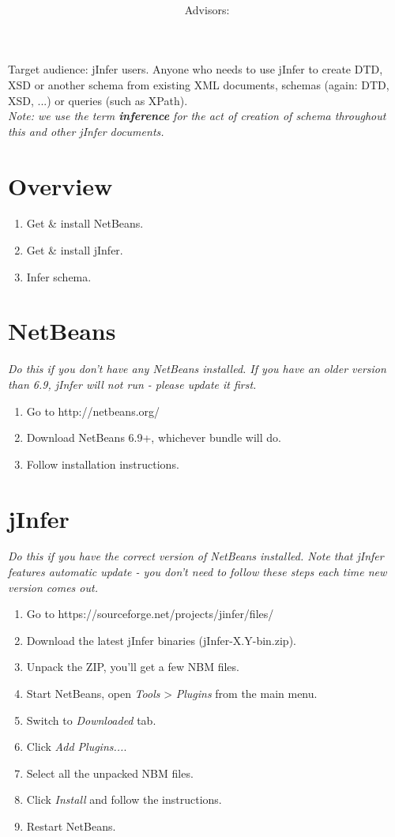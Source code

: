 \documentclass[a4paper,10pt,oneside]{article}
\title{\bf\mftitle}
\author{\mfauthor \\ Advisors: \mfadvisor}
\date{\mfplacedate}
\begin{document}
\maketitle

Target audience: jInfer users. Anyone who needs to use jInfer to create DTD, XSD or another schema from existing XML documents, schemas (again: DTD, XSD, ...) or queries (such as XPath).\\

\textit{Note: we use the term \textbf{inference} for the act of creation of schema throughout this and other jInfer documents.}\\

\section{Overview}
\begin{enumerate}
	\item Get \& install NetBeans.
	\item Get \& install jInfer.
	\item Infer schema.
\end{enumerate}

\section{NetBeans}
\textit{Do this if you don’t have any NetBeans installed. If you have an older version than 6.9, jInfer will not run - please update it first.}
\begin{enumerate}
	\item Go to http://netbeans.org/
	\item Download NetBeans 6.9+, whichever bundle will do.
	\item Follow installation instructions.
\end{enumerate}

\section{jInfer}
\textit{Do this if you have the correct version of NetBeans installed. Note that jInfer features automatic update - you don’t need to follow these steps each time new version comes out.}

\begin{enumerate}
	\item Go to https://sourceforge.net/projects/jinfer/files/
	\item Download the latest jInfer binaries (jInfer-X.Y-bin.zip).
	\item Unpack the ZIP, you’ll get a few NBM files.
	\item Start NetBeans, open \textit{Tools} > \textit{Plugins} from the main menu.
	\item Switch to \textit{Downloaded} tab.
	\item Click \textit{Add Plugins...}.
	\item Select all the unpacked NBM files.
	\item Click \textit{Install} and follow the instructions.
	\item Restart NetBeans.
\end{enumerate}
\end{document}
